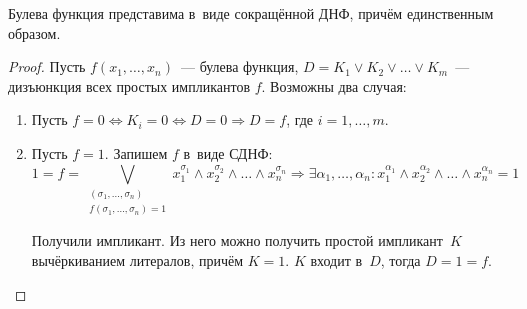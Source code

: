 \begin{statement}
Булева функция представима в~виде сокращённой ДНФ, причём единственным образом.
\end{statement}
\begin{proof}
Пусть $f(x_1, \ldots, x_n)$~--- булева функция, $D = K_1 \lor K_2 \lor \ldots \lor K_m$~--- дизъюнкция всех простых импликантов $f$.
Возможны два случая:
\begin{enumerate}
	\item Пусть $f = 0 \Leftrightarrow
	K_i = 0 \Leftrightarrow
	D = 0 \Rightarrow
	D = f$, где $i = 1, \ldots, m$.
	
	\item Пусть $f = 1$.
	Запишем $f$ в~виде СДНФ:
	\begin{equation*}
	1 = f = \bigvee_{\begin{smallmatrix}
	(\sigma_1, \ldots, \sigma_n) \\
	f(\sigma_1, \ldots, \sigma_n) = 1
	\end{smallmatrix}} x_1^{\sigma_1} \land x_2^{\sigma_2} \land \ldots \land x_n^{\sigma_n} \Rightarrow
	\exists \alpha_1, \ldots, \alpha_n \colon x_1^{\alpha_1} \land x_2^{\alpha_2} \land \ldots \land x_n^{\alpha_n} = 1
	\end{equation*}
	
	Получили импликант.
	Из него можно получить простой импликант~$K$ вычёркиванием литералов, причём $K = 1$.
	$K$ входит в~$D$, тогда $D = 1 = f$.
\end{enumerate}
\end{proof}